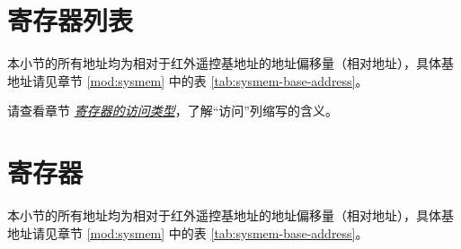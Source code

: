 \documentclass[main\_\_CN.tex]{subfiles}
\begin{document}



\clearpage
\hypertarget{rmt-reg-summ}{}
\section{寄存器列表}
\label{sec:rmt-reg-summ}

本小节的所有地址均为相对于红外遥控基地址的地址偏移量（相对地址），具体基地址请见章节 \ref{mod:sysmem} \textit{} 中的表 \ref{tab:sysmem-base-address}。

请查看章节 \hyperref[glossary-access-types]{\textit{寄存器的访问类型}}，了解“访问”列缩写的含义。






\clearpage
\section{寄存器}

本小节的所有地址均为相对于红外遥控基地址的地址偏移量（相对地址），具体基地址请见章节 \ref{mod:sysmem} \textit{} 中的表 \ref{tab:sysmem-base-address}。


\end{document}
